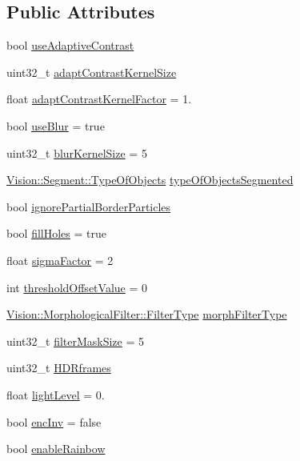 \subsection*{Public Attributes}
\begin{DoxyCompactItemize}
\item 
bool \hyperlink{class_soil_analyzer_1_1_soil_settings_a0e27335d05aed8f3f084744062368578}{use\+Adaptive\+Contrast}
\item 
uint32\+\_\+t \hyperlink{class_soil_analyzer_1_1_soil_settings_a73f627b092dbdbda37b66ef6c2eef95c}{adapt\+Contrast\+Kernel\+Size}
\item 
float \hyperlink{class_soil_analyzer_1_1_soil_settings_ace12c0f4bc35d420ef528cc390fc2cdb}{adapt\+Contrast\+Kernel\+Factor} = 1.
\item 
bool \hyperlink{class_soil_analyzer_1_1_soil_settings_a21bd246a48a712734af86f592030e18b}{use\+Blur} = true
\item 
uint32\+\_\+t \hyperlink{class_soil_analyzer_1_1_soil_settings_afa46542d30045e00fadbdd5a6ab9a1e1}{blur\+Kernel\+Size} = 5
\item 
\hyperlink{class_vision_1_1_segment_ac3ddf2c72ee6333007510b680db1e7dd}{Vision\+::\+Segment\+::\+Type\+Of\+Objects} \hyperlink{class_soil_analyzer_1_1_soil_settings_a21ae88dba6b9b0b07d9c26812bc739fb}{type\+Of\+Objects\+Segmented}
\item 
bool \hyperlink{class_soil_analyzer_1_1_soil_settings_a24fb1d7da2247da77a17d853ea1494d7}{ignore\+Partial\+Border\+Particles}
\item 
bool \hyperlink{class_soil_analyzer_1_1_soil_settings_a2c9dbe9429742aed1da9d9683da5cc1e}{fill\+Holes} = true
\item 
float \hyperlink{class_soil_analyzer_1_1_soil_settings_a97e62512e12a2ba9210fd93950b6e717}{sigma\+Factor} = 2
\item 
int \hyperlink{class_soil_analyzer_1_1_soil_settings_a48330eb812672b50a94483f264614e8f}{threshold\+Offset\+Value} = 0
\item 
\hyperlink{class_vision_1_1_morphological_filter_a1f19c9cb13f0d68778c77d6fd0370868}{Vision\+::\+Morphological\+Filter\+::\+Filter\+Type} \hyperlink{class_soil_analyzer_1_1_soil_settings_ad1420c4800badb3eb07eba4767e3df81}{morph\+Filter\+Type}
\item 
uint32\+\_\+t \hyperlink{class_soil_analyzer_1_1_soil_settings_ad9d5071bbf6d10638df024e883c6199f}{filter\+Mask\+Size} = 5
\item 
uint32\+\_\+t \hyperlink{class_soil_analyzer_1_1_soil_settings_a77e631ff44efe74762b5adaa2eb2cd11}{H\+D\+Rframes}
\item 
float \hyperlink{class_soil_analyzer_1_1_soil_settings_aa4d3ed8c1ab6551bfa4763e8a1ffc148}{light\+Level} = 0.
\item 
bool \hyperlink{class_soil_analyzer_1_1_soil_settings_ad831e13b61fc2097219bbf7252f045d5}{enc\+Inv} = false
\item 
bool \hyperlink{class_soil_analyzer_1_1_soil_settings_a9ece0b96eb8614a497fba3a19d8b4da1}{enable\+Rainbow}
\end{DoxyCompactItemize}

